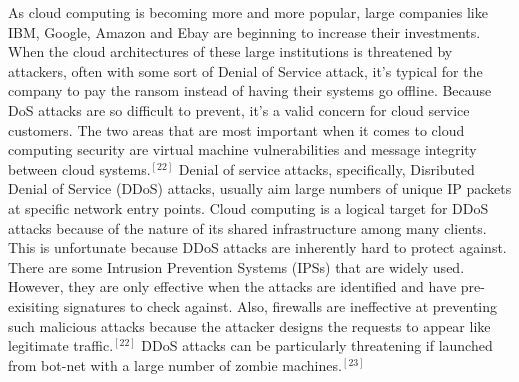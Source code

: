 \documentclass[a4paper, 8pt]{article} %
\begin{document}
\begin{doublespacing}
As cloud computing is becoming more and more popular, large companies like IBM, Google, Amazon and Ebay are beginning to increase their investments.  When the cloud architectures of these large institutions is threatened by attackers, often with some sort of Denial of Service attack, it's typical for the company to pay the ransom instead of having their systems go offline.  Because DoS attacks are so difficult to prevent, it's a valid concern for cloud service customers.  The two areas that are most important when it comes to cloud computing security are virtual machine vulnerabilities and message integrity between cloud systems.$^{[22]}$  Denial of service attacks, specifically, Disributed Denial of Service (DDoS) attacks, usually aim large numbers of unique IP packets at specific network entry points.  Cloud computing is a logical target for DDoS attacks because of the nature of its shared infrastructure among many clients.  This is unfortunate because DDoS attacks are inherently hard to protect against.  There are some Intrusion Prevention Systems (IPSs) that are widely used.  However, they are only effective when the attacks are identified and have pre-exisiting signatures to check against.  Also, firewalls are ineffective at preventing such malicious attacks because the attacker designs the requests to appear like legitimate traffic.$^{[22]}$  DDoS attacks can be particularly threatening if launched from bot-net with a large number of zombie machines.$^{[23]}$  


\end{doublespacing}
\end{document}
